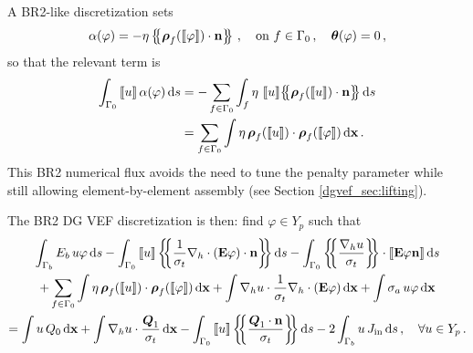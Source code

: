 \documentclass[../doc.tex]{subfiles}
\begin{document}
A BR2-like discretization sets 
	\begin{equation}
		\alpha(\varphi) = -\eta\left\{\!\!\left\{\boldsymbol{\rho}_f(\left\llbracket\varphi \right\rrbracket)\cdot\boldsymbol{\mathrm{n}}\right\}\!\!\right\} \,, \quad \text{on} \ f \in \Gamma_0 \,, \quad \boldsymbol{\theta}(\varphi) = 0 \,,
	\end{equation}
so that the relevant term is 
	\begin{equation}
	\begin{aligned}
		\int_{\Gamma_0} \jump{u} \alpha(\varphi) \ud s &= -\sum_{f\in\Gamma_0}\int_{f} \eta\,\jump{u}\!\avg{\vec{\rho}_f(\jump{u})\cdot\n} \ud s \\
		&= \sum_{f\in\Gamma_0}\int \eta\,\vec{\rho}_f(\jump{u})\cdot\vec{\rho}_f(\jump{\varphi}) \ud \x \,.
	\end{aligned}
	\end{equation}
This BR2 numerical flux avoids the need to tune the penalty parameter while still allowing element-by-element assembly (see Section \ref{dgvef_sec:lifting}). 

The BR2 DG VEF discretization is then: find $\varphi \in Y_p$ such that 
	\begin{multline} \label{dgvef:br2}
		\int_{\Gamma_b} E_b\, u \varphi \ud s - \int_{\Gamma_0} \jump{u} \avg{\frac{1}{\sigma_t}\nablah\cdot\paren{\E\varphi}\cdot\n} \ud s - \int_{\Gamma_0} \avg{\frac{\nablah u}{\sigma_t}} \cdot \jump{\E\varphi\n} \ud s \\
		+ \sum_{f\in\Gamma_0} \int \eta\, \vec{\rho}_f(\jump{u}) \cdot \vec{\rho}_f(\jump{\varphi}) \ud \x + \int \nablah u \cdot \frac{1}{\sigma_t}\nablah\cdot\paren{\E\varphi} \ud \x + \int \sigma_a\, u \varphi \ud \x \\ 
		= \int u\, Q_0 \ud \x + \int \nablah u \cdot \frac{\vec{Q}_1}{\sigma_t} \ud \x - \int_{\Gamma_0} \jump{u} \avg{\frac{\vec{Q}_1\cdot\n}{\sigma_t}} \ud s - 2\int_{\Gamma_b} u\, \Jin \ud s \,, \quad \forall u \in Y_p \,. 
	\end{multline}
\end{document}
